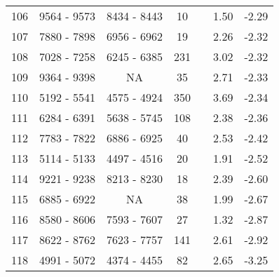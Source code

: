 \documentclass[]{article}
\begin{document}
\begin{landscape}
\begin{longtable}{ccccccc}
		106 & 9564 - 9573 & 8434 - 8443 & 10 &  & 1.50 & -2.29\tabularnewline
		\rowcolor{black!20} 107 & 7880 - 7898 & 6956 - 6962 & 19 &  & 2.26 & -2.32\tabularnewline
		108 & 7028 - 7258 & 6245 - 6385 & 231 &  & 3.02 & -2.32\tabularnewline
		\rowcolor{black!20} 109 & 9364 - 9398 & NA & 35 &  & 2.71 & -2.33\tabularnewline
		110 & 5192 - 5541 & 4575 - 4924 & 350 &  & 3.69 & -2.34\tabularnewline
		\rowcolor{black!20} 111 & 6284 - 6391 & 5638 - 5745 & 108 &  & 2.38 & -2.36\tabularnewline
		112 & 7783 - 7822 & 6886 - 6925 & 40 &  & 2.53 & -2.42\tabularnewline
		\rowcolor{black!20} 113 & 5114 - 5133 & 4497 - 4516 & 20 &  & 1.91 & -2.52\tabularnewline
		114 & 9221 - 9238 & 8213 - 8230 & 18 &  & 2.39 & -2.60\tabularnewline
		\rowcolor{black!20} 115 & 6885 - 6922 & NA & 38 &  & 1.99 & -2.67\tabularnewline
		116 & 8580 - 8606 & 7593 - 7607 & 27 &  & 1.32 & -2.87\tabularnewline
		\rowcolor{black!20} 117 & 8622 - 8762 & 7623 - 7757 & 141 &  & 2.61 & -2.92\tabularnewline
		118 & 4991 - 5072 & 4374 - 4455 & 82 &  & 2.65 & -3.25\tabularnewline	
	\end{longtable}
\end{landscape}

\end{document}
